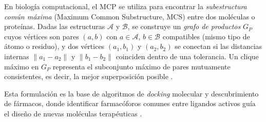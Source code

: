En biología computacional, el MCP se utiliza para encontrar la \emph{subestructura común máxima} (Maximum Common Substructure, MCS) entre dos moléculas o proteínas. Dadas las estructuras $\mathcal{A}$ y $\mathcal{B}$, se construye un \emph{grafo de productos} $G_P$ cuyos vértices son pares $(a,b)$ con $a \in \mathcal{A}$, $b \in \mathcal{B}$ compatibles (mismo tipo de átomo o residuo), y dos vértices $(a_1,b_1)$ y $(a_2,b_2)$ se conectan si las distancias internas $\|a_1-a_2\|$ y $\|b_1-b_2\|$ coinciden dentro de una tolerancia. Un clique máximo en $G_P$ representa el subconjunto máximo de pares mutuamente consistentes, es decir, la mejor superposición posible \parencite{bomze1999, gardiner1997clique}.

Esta formulación es la base de algoritmos de \textit{docking} molecular y descubrimiento de fármacos, donde identificar farmacóforos comunes entre ligandos activos guía el diseño de nuevas moléculas terapéuticas \parencite{gardiner1997clique}.